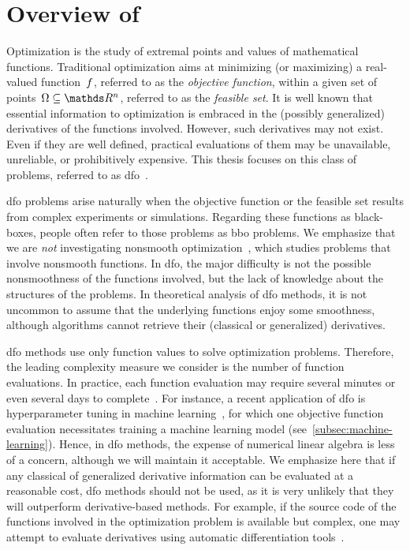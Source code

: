 \section{Overview of }

Optimization is the study of extremal points and values of mathematical functions.
Traditional optimization aims at minimizing (or maximizing) a real-valued function~$f$, referred to as the \emph{objective function}, within a given set of points~$\Omega \subseteq \R^n$, referred to as the \emph{feasible set}.
It is well known that essential information to optimization is embraced in the (possibly generalized) derivatives of the functions involved.
However, such derivatives may not exist.
Even if they are well defined, practical evaluations of them may be unavailable, unreliable, or prohibitively expensive.
This thesis focuses on this class of problems, referred to as \gls{dfo}~\cite{Conn_Scheinberg_Vicente_2009b,Audet_Hare_2017,Custodio_Scheinberg_Vicente_2017,Larson_Menickelly_Wild_2019}.

\Gls{dfo} problems arise naturally when the objective function or the feasible set results from complex experiments or simulations.
Regarding these functions as black-boxes, people often refer to those problems as \gls{bbo} problems.
We emphasize that we are \emph{not} investigating nonsmooth optimization~\cite{Clark_1983,Cui_Pang_2021}, which studies problems that involve nonsmooth functions.
In \gls{dfo}, the major difficulty is not the possible nonsmoothness of the functions involved, but the lack of knowledge about the structures of the problems.
In theoretical analysis of \gls{dfo} methods, it is not uncommon to assume that the underlying functions enjoy some smoothness, although algorithms cannot retrieve their (classical or generalized) derivatives.

\Gls{dfo} methods use only function values to solve optimization problems.
Therefore, the leading complexity measure we consider is the number of function evaluations.
In practice, each function evaluation may require several minutes or even several days to complete~\cite[\S 1.4]{Audet_Hare_2017}.
For instance, a recent application of \gls{dfo} is hyperparameter tuning in machine learning~\cite{Ghanbari_Scheinberg_2017}, for which one objective function evaluation necessitates training a machine learning model (see~\cref{subsec:machine-learning}).
Hence, in \gls{dfo} methods, the expense of numerical linear algebra is less of a concern, although we will maintain it acceptable.
We emphasize here that if any classical of generalized derivative information can be evaluated at a reasonable cost, \gls{dfo} methods should not be used, as it is very unlikely that they will outperform derivative-based methods.
For example, if the source code of the functions involved in the optimization problem is available but complex, one may attempt to evaluate derivatives using automatic differentiation tools~\cite{Griewank_2003,Griewank_Walther_2008}.

